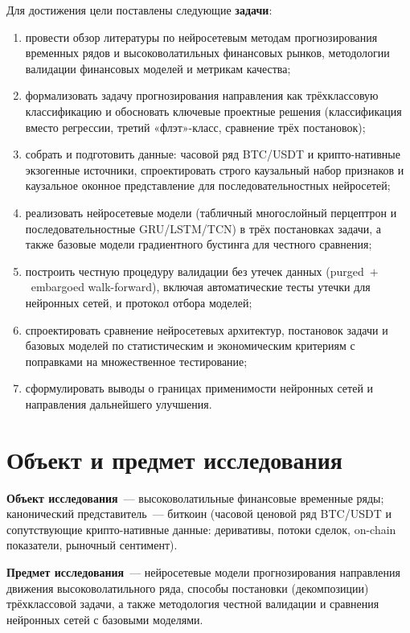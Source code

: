 \documentclass[12pt,a4paper]{report}
\begin{document}
Для достижения цели поставлены следующие \textbf{задачи}:
\begin{enumerate}[leftmargin=*]
  \item провести обзор литературы по нейросетевым методам прогнозирования
        временных рядов и высоковолатильных финансовых рынков, методологии
        валидации финансовых моделей и метрикам качества;
  \item формализовать задачу прогнозирования направления как трёхклассовую
        классификацию и обосновать ключевые проектные решения (классификация
        вместо регрессии, третий «флэт»-класс, сравнение трёх постановок);
  \item собрать и подготовить данные: часовой ряд BTC/USDT и крипто-нативные
        экзогенные источники, спроектировать строго каузальный набор признаков и
        каузальное оконное представление для последовательностных нейросетей;
  \item реализовать нейросетевые модели (табличный многослойный перцептрон и
        последовательностные GRU/LSTM/TCN) в трёх постановках задачи, а также
        базовые модели градиентного бустинга для честного сравнения;
  \item построить честную процедуру валидации без утечек данных
        (purged~$+$~embargoed walk-forward), включая автоматические тесты утечки
        для нейронных сетей, и протокол отбора моделей;
  \item спроектировать сравнение нейросетевых архитектур, постановок задачи и
        базовых моделей по статистическим и экономическим критериям с поправками на
        множественное тестирование;
  \item сформулировать выводы о границах применимости нейронных сетей и направления
        дальнейшего улучшения.
\end{enumerate}

\section*{Объект и предмет исследования}

\textbf{Объект исследования}~--- высоковолатильные финансовые временные ряды;
канонический представитель~--- биткоин (часовой ценовой ряд BTC/USDT и
сопутствующие крипто-нативные данные: деривативы, потоки сделок, on-chain
показатели, рыночный сентимент).

\textbf{Предмет исследования}~--- нейросетевые модели прогнозирования направления
движения высоковолатильного ряда, способы постановки (декомпозиции) трёхклассовой
задачи, а также методология честной валидации и сравнения нейронных сетей с
базовыми моделями.
\end{document}

